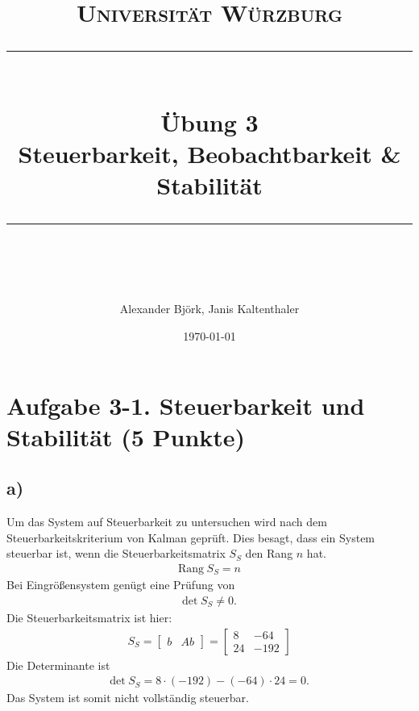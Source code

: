 \documentclass[11pt]{scrartcl} %
\title{	
	\normalfont\normalsize
	\textsc{Universität Würzburg}\\ %
	\vspace{25pt} %
	\rule{\linewidth}{0.5pt}\\ %
	\vspace{20pt} %
	{\huge Übung 3}\\ %
	{\Large Steuerbarkeit, Beobachtbarkeit \& Stabilität}\\
	\vspace{12pt} %
	\rule{\linewidth}{2pt}\\ %
	\vspace{12pt} %
}
\author{\LARGE Alexander Björk, Janis Kaltenthaler} %
\date{\normalsize\today} %
\begin{document}
\maketitle %


\section*{Aufgabe 3-1. Steuerbarkeit und Stabilität (5 Punkte)}
\subsection*{a)}
Um das System auf Steuerbarkeit zu untersuchen wird nach dem Steuerbarkeitskriterium von Kalman geprüft. Dies besagt, dass ein System steuerbar ist, wenn die Steuerbarkeitsmatrix $S_S$ den Rang $n$ hat.
\begin{align*}
\text{Rang} \hspace{3pt} S_S = n
\end{align*}
Bei Eingrößensystem genügt eine Prüfung von
\begin{align*}
\text{det} \hspace{3pt} S_S \neq 0.
\end{align*}
Die Steuerbarkeitsmatrix ist hier:
\begin{align*}
S_S=\begin{bmatrix}
b & Ab
\end{bmatrix} =
\begin{bmatrix}
8 & -64 \\
24 & -192
\end{bmatrix}
\end{align*}
Die Determinante ist
\begin{align*}
\text{det} \hspace{3pt} S_S=8\cdot (-192) - (-64) \cdot 24 = 0.
\end{align*}
Das System ist somit nicht vollständig steuerbar.
\end{document}
